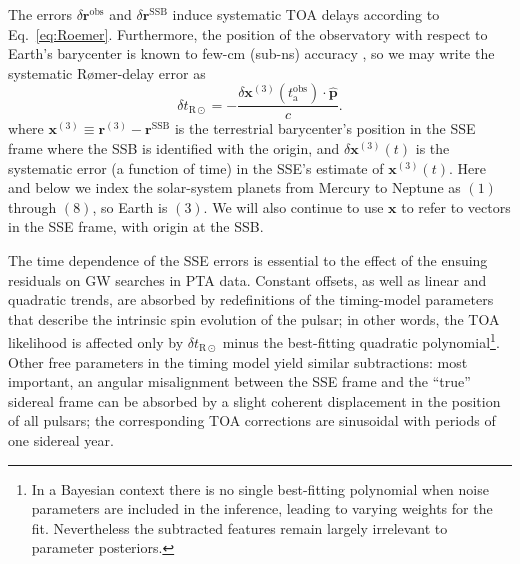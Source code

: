 \documentclass{aastex63}
\begin{document}
The errors $\delta \mathbf{r}^\mathrm{obs}$ and $\delta \mathbf{r}^\mathrm{SSB}$ induce systematic TOA delays according to Eq.\ \eqref{eq:Roemer}.
Furthermore, the position of the observatory with respect to Earth's barycenter is known to few-cm (sub-ns) accuracy \citep{ehm06}, so we may write the systematic R{\o}mer-delay error as
%
\begin{equation}
\label{eq:deltar}
\delta t_{\mathrm{R}\odot} = -\frac{\delta \mathbf{x}^{(3)}(t_\mathrm{a}^\mathrm{obs})\cdot\hat{\mathbf{p}}}{c}.
\end{equation}
%
where $\mathbf{x}^{(3)} \equiv \mathbf{r}^{(3)} - \mathbf{r}^\mathrm{SSB}$
is the terrestrial barycenter's position in the SSE frame where the SSB is identified with the origin, and $\delta \mathbf{x}^{(3)}(t)$ is the systematic error (a function of time) in the SSE's estimate of $\mathbf{x}^{(3)}(t)$. Here and below we index the solar-system planets from Mercury to Neptune as $(1)$ through $(8)$, so Earth is $(3)$. We will also continue to use $\mathbf{x}$ to refer to vectors in the SSE frame, with origin at the SSB.

The time dependence of the SSE errors is essential to the effect of the ensuing residuals on GW searches in PTA data. Constant offsets, as well as linear and quadratic trends, are absorbed by redefinitions of the timing-model parameters that describe the intrinsic spin evolution of the pulsar; in other words, the TOA likelihood is affected only by $\delta t_{\mathrm{R}\odot}$ minus the best-fitting quadratic polynomial\footnote{In a Bayesian context there is no single best-fitting polynomial when noise parameters are included in the inference, leading to varying weights for the fit. Nevertheless the subtracted features remain largely irrelevant to parameter posteriors.}. Other free parameters in the timing model yield similar subtractions: most important, an angular misalignment between the SSE frame and the ``true'' sidereal frame can be absorbed by a slight coherent displacement in the position of all pulsars; the corresponding TOA corrections are sinusoidal with periods of one sidereal year.
\end{document}
